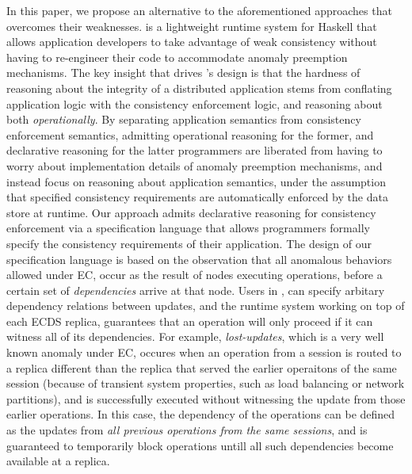 %
%

In this paper, we propose an alternative to the aforementioned
approaches that overcomes their weaknesses.  \tool is a lightweight
runtime system for Haskell that allows application developers to take
advantage of weak consistency without having to re-engineer their code
to accommodate anomaly preemption mechanisms.  The key insight that
drives \tool's design is that the hardness of reasoning about the
integrity of a distributed application stems from conflating
application logic with the consistency enforcement logic, and reasoning
about both \emph{operationally}.  By separating application semantics
from consistency enforcement semantics, admitting operational
reasoning for the former, and declarative reasoning for the latter
programmers are liberated from having to worry about implementation details of
anomaly preemption mechanisms, and instead focus on reasoning about
application semantics, under the assumption that specified consistency
requirements are automatically enforced by the data store at runtime.  
%
Our approach admits declarative reasoning for consistency enforcement via
a specification language that allows programmers formally specify the
consistency requirements of their application. 
The design of our
specification language is based on the observation that all
anomalous behaviors allowed under EC, occur as 
the result of nodes executing operations, before a certain set of
\emph{dependencies} arrive at that node. 
Users in \tool, can
specify arbitary dependency relations between updates, and the 
runtime system working on top of each ECDS replica, guarantees that an 
operation will only proceed if it can witness all of its dependencies. 
For example, \emph{lost-updates}, which is a very well known anomaly
under EC, occures when an operation from a session
is routed to a replica different than the replica that served the earlier
operaitons of the same session (because of transient system
properties, such as load balancing or network partitions),
and is successfully executed without witnessing the update from those
earlier  operations.
In this case, the dependency of the operations can be defined as the
updates from \emph{all previous operations from the same sessions}, and
\tool is guaranteed to temporarily block operations untill all such
dependencies become available at a replica.

%
%

